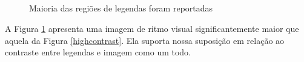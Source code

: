 \documentclass[12pt]{article}
\begin{document}
\begin{figure}[h!]
  \centering
  \quad
  \\
  \quad
  \\
  \quad
  \\
  \quad
  \\
  \caption{Maioria das regiões de legendas foram reportadas\label{highcontrast2}}
\end{figure}

A  Figura \ref{highcontrast2}  apresenta  uma imagem  de ritmo  visual
significantemente maior  que aquela da  Figura \ref{highcontrast}. Ela
suporta  nossa suposição  em  relação ao  contraste  entre legendas  e
imagem como um todo.
\end{document}
